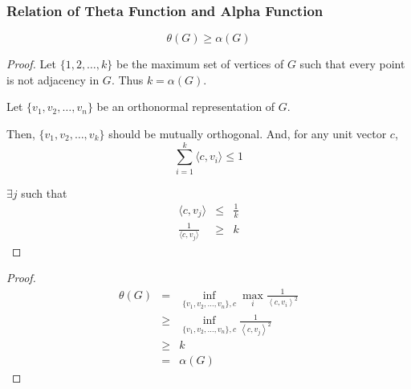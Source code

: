       \begin{frame}
            \frametitle{Relation of Theta Function and Alpha Function}

            \begin{lemma}
                  \begin{equation}
                        \theta(G) \geq \alpha(G)
                  \end{equation}
            \end{lemma}
      \end{frame}

      \begin{frame}
            \begin{proof}
                  Let $ \{1,2,\dots,k\} $ be the maximum set of vertices of $ G $ such that every point is not adjacency in $ G $. Thus $ k = \alpha(G) $.

                  Let $ \{v_1, v_2, \dots, v_n\} $ be an orthonormal representation of $ G $.

                  Then, $\{v_{1},v_{2},\hdots,v_{k}\}$ should be mutually orthogonal. And, for any unit vector $c$,
                  \begin{equation}
                        \sum_{i=1}^{k} \langle c, v_{i} \rangle \le 1
                  \end{equation}

                  $\exists j$ such that
                  \begin{eqnarray}
                        \langle c, v_{j} \rangle &\le& \frac{1}{k} \\
                        \frac{1}{\langle c, v_{j} \rangle} &\ge& k
                  \end{eqnarray}
                  
            \end{proof}
      \end{frame}

      \begin{frame}
            \begin{proof}
                  \begin{eqnarray}
                        \theta(G) &=& \inf_{\{v_1, v_2, \dots, v_n\},c} \max_{i} \frac{1}{\left<c,v_{i}\right>^2} \\
                              &\ge& \inf_{\{v_1, v_2, \dots, v_n\},c} \frac{1}{\left<c,v_{j}\right>^2} \\
                              &\ge& k \\
                              &=& \alpha(G)
                  \end{eqnarray}
            \end{proof}
      \end{frame}

